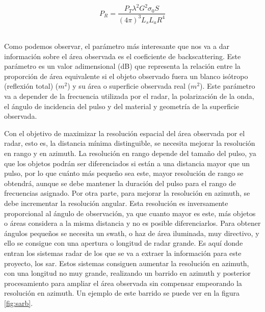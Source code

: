 \\
\begin{equation} \label{Pr}
P_{R}=\frac{P_{T}\lambda ^{2}G^{2}\sigma_{0}S}{(4\pi ) ^{3}L_{s}L_{a}R^{4}}
\end{equation}
\\
\par Como podemos observar, el parámetro más interesante que nos va a dar información sobre el área observada es el coeficiente de backscattering. Este parámetro es un valor adimensional (dB) que representa la relación entre la proporción de área equivalente si el objeto observado fuera un blanco isótropo (reflexión total) ($m^{2}$) y su área o superficie observada real ($m^{2}$). Este parámetro va a depender de la frecuencia utilizada por el radar, la polarización de la onda, el ángulo de incidencia del pulso y del material y geometría de la superficie observada.
\\
\par Con el objetivo de maximizar la resolución espacial del área observada por el radar, esto es, la distancia mínima distinguible, se necesita mejorar la resolución en rango y en azimuth. La resolución en rango depende del tamaño del pulso, ya que los objetos podrán ser diferenciados si están a una distancia mayor que un pulso, por lo que cuánto más pequeño sea este, mayor resolución de rango se obtendrá, aunque se debe mantener la duración del pulso para el rango de frecuencias asignado. Por otra parte, para mejorar la resolución en azimuth, se debe incrementar la resolución angular. Esta resolución es inversamente proporcional al ángulo de observación, ya que cuanto mayor es este, más objetos o áreas considera a la misma distancia y no es posible diferenciarlos. Para obtener ángulos pequeños se necesita un swath, o haz de área iluminada, muy directivo, y ello se consigue con una apertura o longitud de radar grande. Es aquí donde entran los sistemas radar de los que se va a extraer la información para este proyecto, los \gls{sar}. Estos sistemas consiguen aumentar la resolución en azimuth, con una longitud no muy grande, realizando un barrido en azimuth y posterior procesamiento para ampliar el área observada sin compensar empeorando la resolución en azimuth. Un ejemplo de este barrido se puede ver en la figura \ref{fig:sarb}.
\\

